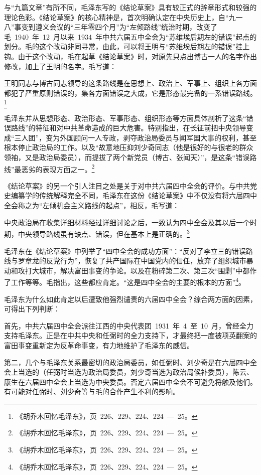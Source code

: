 与“九篇文章”有所不同，毛泽东写的《结论草案》具有较正式的辞章形式和较强的理论色彩。《结论草案》的核心精神是，首次明确认定在中央历史上，自“九一八”事变到遵义会议的“三年零四个月”为“左倾路线”统治时期，改变了毛~1940~年~12~月以来~1934~年中共六届五中全会为“苏维埃后期左的错误”起点的划分。毛的这个改动非同寻常，由此，可以将王明与“苏维埃后期左的错误”挂上钩。由于这个改动，毛在起草《结论草案》时，对原先只点出博古一人的名字作出修改，加上了王明的名字。毛写道：

\begin{quoting}
王明同志与博古同志领导的这条路线是在思想上、政治上、军事上、组织上各方面都犯了严重原则错误的，集各方面错误之大成，它是形态最完备的一系错误路线。\footnote{《胡乔木回忆毛泽东》，页~226、229、224、224~—~25。}
\end{quoting}毛泽东并从思想形态、政治形态、军事形态、组织形态等方面具体剖析了这条“错误路线”的特征和对中共革命造成的巨大危害。特别指出，在长征前把中央领导变成“三人团”，变为外国顾问一人专政，剥夺政治局委员与闻军国大事的权利，甚至根本停止政治局的工作。以及“故意地压抑刘少奇同志（他是很好的与很老的群众领袖，又是政治局委员），而提拔了两个新党员（博古、张闻天）”，是这条“错误路线”最恶劣的表现方面之一。\footnote{《胡乔木回忆毛泽东》，页~226、229、224、224~—~25。}

《结论草案》的另一个引人注目之处是关于对中共六届四中全会的评价。与中共党史编纂学的传统解释完全不同，毛泽东在这份《结论草案》中不仅没有将六届四中全会称之为“左倾机会主义路线的起点”，相反，毛写道：

\begin{quoting}
中央政治局在收集详细材料经过详细讨论之后，一致认为四中全会及其以后一个时期，中央领导路线虽有缺点、错误，但在基本上是正确的。\footnote{《胡乔木回忆毛泽东》，页~226、229、224、224~—~25。}
\end{quoting}毛泽东在《结论草案》中列举了“四中全会的成功方面”：“反对了李立三的错误路线与罗章龙的反党行为”，恢复了共产国际在中国党内的信任，放弃了组织城市暴动和攻打大城市，解决富田事变的争论。以及在粉碎第二次、第三次“围剿”中都作了工作等等。毛指出，这些都应肯定。“这是四中全会的主要的根本的方面”\footnote{《胡乔木回忆毛泽东》，页~226、229、224、224~—~25。}。

毛泽东为什么如此肯定以后遭致他强烈谴责的六届四中全会？综合两方面的因素，可得出下列判断：

首先，中共六届四中全会派往江西的中央代表团~1931~年~4~至~10~月，曾经全力支持毛泽东。正是在中共中央和任弼时的全力支持下，才最终把一度被项英翻案的富田事变重新定为反革命事变，有力地维护了毛泽东的威信。

第二，几个与毛泽东关系最密切的政治局委员，如任弼时、刘少奇是在六届四中全会上当选的（任弼时当选为政治局委员，刘少奇当选为政治局候补委员），陈云、康生在六届四中全会上当选为中央委员。否定六届四中全会不可避免将触及他们。有可能对任弼时、刘少奇等与毛的合作产生不利的影响。

